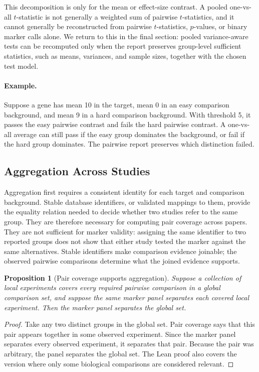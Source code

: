 \documentclass{article}
\newtheorem{proposition}{Proposition}
\begin{document}
This decomposition is only for the mean or effect-size contrast. A pooled one-vs-all $t$-statistic is not generally a weighted sum of pairwise $t$-statistics, and it cannot generally be reconstructed from pairwise $t$-statistics, $p$-values, or binary marker calls alone. We return to this in the final section: pooled variance-aware tests can be recomputed only when the report preserves group-level sufficient statistics, such as means, variances, and sample sizes, together with the chosen test model.

\paragraph{Example.}
Suppose a gene has mean 10 in the target, mean 0 in an easy comparison background, and mean 9 in a hard comparison background. With threshold 5, it passes the easy pairwise contrast and fails the hard pairwise contrast. A one-vs-all average can still pass if the easy group dominates the background, or fail if the hard group dominates. The pairwise report preserves which distinction failed.

\subsection{Aggregation Across Studies}

Aggregation first requires a consistent identity for each target and comparison background. Stable database identifiers, or validated mappings to them, provide the equality relation needed to decide whether two studies refer to the same group. They are therefore necessary for computing pair coverage across papers. They are not sufficient for marker validity: assigning the same identifier to two reported groups does not show that either study tested the marker against the same alternatives. Stable identifiers make comparison evidence joinable; the observed pairwise comparisons determine what the joined evidence supports.

\begin{proposition}[Pair coverage supports aggregation]\label{prop:pair-coverage-aggregation}
Suppose a collection of local experiments covers every required pairwise comparison in a global comparison set, and suppose the same marker panel separates each covered local experiment. Then the marker panel separates the global set.
\end{proposition}

\begin{proof}
Take any two distinct groups in the global set. Pair coverage says that this pair appears together in some observed experiment. Since the marker panel separates every observed experiment, it separates that pair. Because the pair was arbitrary, the panel separates the global set. The Lean proof also covers the version where only some biological comparisons are considered relevant.
\end{proof}
\end{document}

